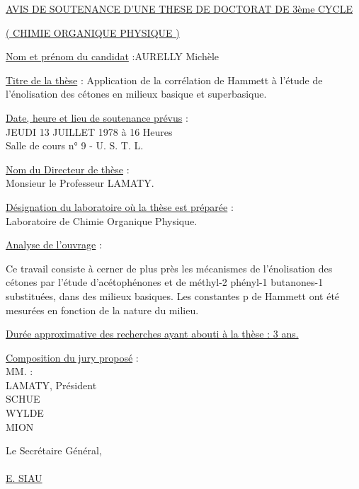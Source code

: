 \uline{AVIS DE SOUTENANCE D'UNE THESE DE DOCTORAT DE 3ème CYCLE}

\uline{( CHIMIE ORGANIQUE PHYSIQUE )}

\uline{Nom et prénom du candidat} :\qquad AURELLY Michèle

\uline{Titre de la thèse} : Application de la corrélation de Hammett à l'étude de l'énolisation des cétones en milieux basique et superbasique.

\uline{Date, heure et lieu de soutenance prévus} :\\
JEUDI 13 JUILLET 1978 à 16 Heures\\
Salle de cours n° 9 - U. S. T. L.

\uline{Nom du Directeur de thèse} :\\
Monsieur le Professeur LAMATY.

\uline{Désignation du laboratoire où la thèse est préparée} :\\
Laboratoire de Chimie Organique Physique.

\uline{Analyse de l'ouvrage} :

Ce travail consiste à cerner de plus près les mécanismes de l'énolisation des cétones par l'étude d'acétophénones et de méthyl-2 phényl-1 butanones-1 substituées, dans des milieux basiques. Les constantes p de Hammett ont été mesurées en fonction de la nature du milieu.

\uline{Durée approximative des recherches ayant abouti à la thèse : 3 ans.}

\uline{Composition du jury proposé} :\\
MM. :\\
LAMATY, Président\\
SCHUE\\
WYLDE\\
MION

Le Secrétaire Général,\\
\\
\uline{E. SIAU}

